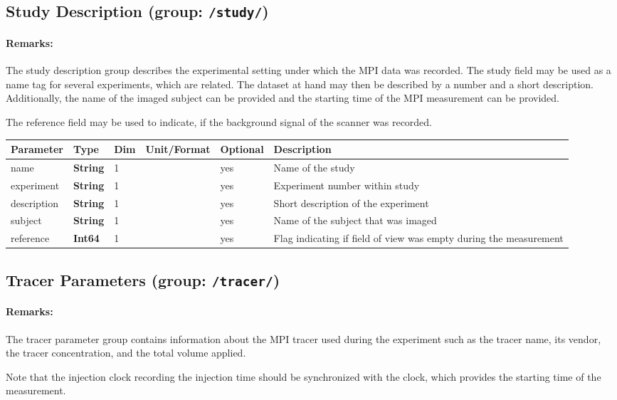 \documentclass[landscape]{article} %
\newcommand{\inl}[1]{\lstinline[columns=fixed]{#1}}
\newcommand{\inltab}[1]{{\ttfamily\bfseries\color{blue}#1}}
\newcommand{\inlvar}[1]{{\ttfamily#1}}
\begin{document}
\subsection{Study Description (group: \inl{/study/})}

\begin{multicols}{2}

\paragraph{Remarks:} The study description group describes the experimental setting under which the MPI data was recorded. The study field may be used as a name tag for several experiments, which are related. The dataset at hand may then be described by a number and a short description. Additionally, the name of the imaged subject can be provided and the starting time of the MPI measurement can be provided.

The reference field may be used to indicate, if the background signal of the scanner was recorded.

\end{multicols}


\noindent \begin{tabularx}{\columnwidth}{lllllX} 
\textbf{Parameter} & \textbf{Type} & \textbf{Dim} & \textbf{Unit/Format} & \textbf{Optional} & \textbf{Description} \\ \hline 
\inlvar{name} & \inltab{String} & 1 & & yes & Name of the study \\ \hline
\inlvar{experiment} & \inltab{String} & 1 & & yes & Experiment number within study \\ \hline
\inlvar{description} & \inltab{String} & 1 & & yes & Short description of the experiment \\ \hline
\inlvar{subject} & \inltab{String} & 1 & & yes & Name of the subject that was imaged \\ \hline 
\inlvar{reference} & \inltab{Int64} & 1 & & yes & Flag indicating if field of view was empty during the measurement \\ \hline
\end{tabularx}


\subsection{Tracer Parameters (group: \inl{/tracer/})}

\begin{multicols}{2}

\paragraph{Remarks:} The tracer parameter group contains information about the MPI tracer used during the experiment such as the tracer name, its vendor, the tracer concentration, and the total volume applied.

Note that the injection clock recording the injection time should be synchronized with the clock, which provides the starting time of the measurement.

\end{multicols}
\end{document}
